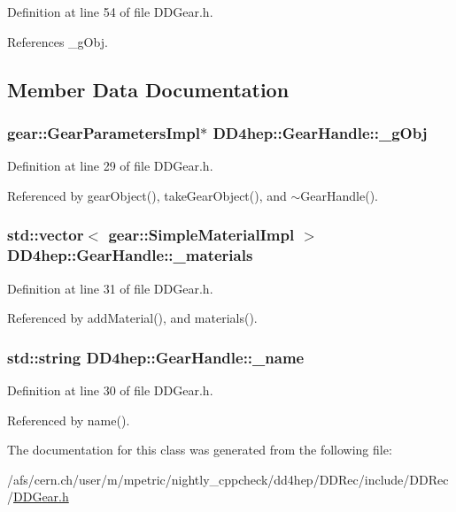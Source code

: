 Definition at line 54 of file DDGear.h.

References \_\-gObj.

\subsection{Member Data Documentation}
\hypertarget{class_d_d4hep_1_1_gear_handle_a211b76e59d3561a189c0f5b3b7186d08}{
\subsubsection[{\_\-gObj}]{\setlength{\rightskip}{0pt plus 5cm}gear::GearParametersImpl$\ast$ {\bf DD4hep::GearHandle::\_\-gObj}}}
\label{class_d_d4hep_1_1_gear_handle_a211b76e59d3561a189c0f5b3b7186d08}


Definition at line 29 of file DDGear.h.

Referenced by gearObject(), takeGearObject(), and $\sim$GearHandle().\hypertarget{class_d_d4hep_1_1_gear_handle_a7a666fef6469ba28d864d41e16000c29}{
\subsubsection[{\_\-materials}]{\setlength{\rightskip}{0pt plus 5cm}std::vector$<$ gear::SimpleMaterialImpl $>$ {\bf DD4hep::GearHandle::\_\-materials}}}
\label{class_d_d4hep_1_1_gear_handle_a7a666fef6469ba28d864d41e16000c29}


Definition at line 31 of file DDGear.h.

Referenced by addMaterial(), and materials().\hypertarget{class_d_d4hep_1_1_gear_handle_a73f13b4c51b157ad9ff56335a5063d3b}{
\subsubsection[{\_\-name}]{\setlength{\rightskip}{0pt plus 5cm}std::string {\bf DD4hep::GearHandle::\_\-name}}}
\label{class_d_d4hep_1_1_gear_handle_a73f13b4c51b157ad9ff56335a5063d3b}


Definition at line 30 of file DDGear.h.

Referenced by name().

The documentation for this class was generated from the following file:\begin{DoxyCompactItemize}
\item 
/afs/cern.ch/user/m/mpetric/nightly\_\-cppcheck/dd4hep/DDRec/include/DDRec/\hyperlink{_d_d_gear_8h}{DDGear.h}\end{DoxyCompactItemize}
